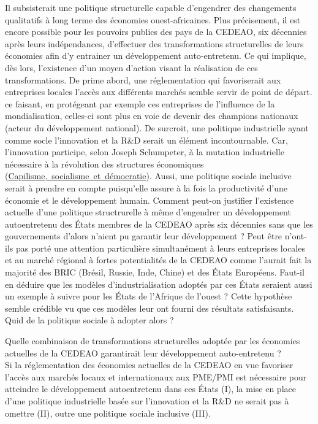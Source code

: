 	\hspace*{.5cm} Il subsisterait une politique structurelle capable d'engendrer des changements qualitatifs à long terme des économies ouest-africaines. Plus précisement, il est encore possible pour les pouvoirs publics des pays de la CEDEAO, six décennies après leurs indépendances, d'effectuer des transformations structurelles de leurs économies afin d'y entrainer un développement auto-entretenu. Ce qui implique, dès lors, l'existence d'un moyen d'action visant la réalisation de ces transformations. De prime abord, une réglementation qui favoriserait aux entreprises locales l'accès aux différents marchés semble servir de point de départ. ce faisant, en protégeant par exemple ces entreprises de l'influence de la mondialisation, celles-ci sont plus en voie de devenir des champions nationaux (acteur du développement national). De surcroit, une politique industrielle ayant comme socle l'innovation et la R\&D serait un élément incontournable. Car, l'innovation participe, selon Joseph Schumpeter, à la mutation industrielle nécessaire à la révolution des structures économiques (\mbox{\underline{Capilisme, socialisme et démocratie}}). Aussi, une politique sociale inclusive serait à prendre en compte puisqu'elle assure à la fois la productivité d'une économie et le développement humain. Comment peut-on justifier l'existence actuelle d'une politique structrurelle à même d'engendrer un développement autoentretenu des \'Etats membres de la CEDEAO après six décennies sans que les gouvernements d'alors n'aient pu garantir leur développement ? Peut être n'ont-ils pas porté une attention particulière simultanément à leurs entreprises locales et au marché régional à fortes potentialités de la CEDEAO comme l'aurait fait la majorité des BRIC (Brésil, Russie, Inde, Chine) et des \'Etats Européens. Faut-il en déduire que les modèles d'industrialisation adoptés par ces \'Etats seraient aussi un exemple à suivre pour les \'Etats de l'Afrique de l'ouest ? Cette hypothèse semble crédible vu que ces modèles leur ont fourni des résultats satisfaisants. Quid de la politique sociale à adopter alors ?
	
	\hspace*{.5cm} Quelle combinaison de transformations structurelles adoptée par les économies actuelles de la CEDEAO garantirait leur développement auto-entretenu ?\\
	
	\hspace*{.5cm}Si la réglementation des économies actuelles de la CEDEAO en vue favoriser l'accès aux marchés locaux et internationaux aux PME/PMI est nécessaire pour atteindre le développement autoentretenu dans ces \'Etats (I), la mise en place d'une politique industrielle basée sur l'innovation et la R\&D ne serait pas à omettre (II), outre une politique sociale inclusive (III). 
	
